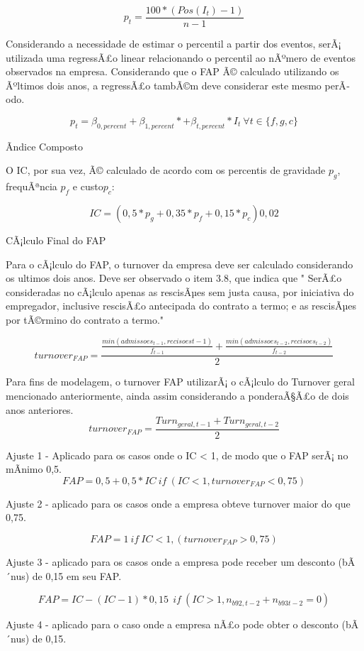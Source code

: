 \documentclass[]{article}
\begin{document}
\[p_t = \frac{100*(Pos(I_{t})-1)}{n-1}\]

Considerando a necessidade de estimar o percentil a partir dos eventos,
serÃ¡ utilizada uma regressÃ£o linear relacionando o percentil ao
nÃºmero de eventos observados na empresa. Considerando que o FAP Ã©
calculado utilizando os Ãºltimos dois anos, a regressÃ£o tambÃ©m deve
considerar este mesmo perÃ­odo.

\[p_t = \beta_{0,percent} + \beta_{1,percent} *  +\beta_{t,percent} * I_t \ \forall t \in \{f,g,c\}\]

Ãndice Composto

O IC, por sua vez, Ã© calculado de acordo com os percentis de gravidade
\(p_g\), frequÃªncia \(p_{f}\) e custo\(p_c\):

\[IC = (0,5*p_g + 0,35*p_{f}+0,15*p_c)0,02\]

CÃ¡lculo Final do FAP

Para o cÃ¡lculo do FAP, o turnover da empresa deve ser calculado
considerando os ultimos dois anos. Deve ser observado o item 3.8, que
indica que " SerÃ£o consideradas no cÃ¡lculo apenas as rescisÃµes sem
justa causa, por iniciativa do empregador, inclusive rescisÃ£o
antecipada do contrato a termo; e as rescisÃµes por tÃ©rmino do contrato
a termo."

\[turnover_{FAP} = \frac{\frac{min(admissoes_{t-1}, recisoes{t-1})}{f_{t-1}} + \frac{min(admissoes_{t-2}, recisoes_{t-2})}{f_{t-2}}}{2}\]

Para fins de modelagem, o turnover FAP utilizarÃ¡ o cÃ¡lculo do Turnover
geral mencionado anteriormente, ainda assim considerando a ponderaÃ§Ã£o
de dois anos anteriores.
\[turnover_{FAP} = \frac{Turn_{geral,t-1} + Turn_{geral,t-2}}{2}\]

Ajuste 1 - Aplicado para os casos onde o IC \textless{} 1, de modo que o
FAP serÃ¡ no mÃ­nimo 0,5.
\[FAP = 0,5 + 0,5 * IC \ if \ (IC < 1, turnover_{FAP} < 0,75) \]

Ajuste 2 - aplicado para os casos onde a empresa obteve turnover maior
do que 0,75.

\[FAP = 1 \ if \ IC < 1, (turnover_{FAP} > 0,75)\]

Ajuste 3 - aplicado para os casos onde a empresa pode receber um
desconto (bÃ´nus) de 0,15 em seu FAP.

\[FAP = IC - (IC-1)*0,15 \ \ if \ (IC > 1, n_{b92,t-2}+n_{b93t-2} = 0)\]

Ajuste 4 - aplicado para o caso onde a empresa nÃ£o pode obter o
desconto (bÃ´nus) de 0,15.
\end{document}
